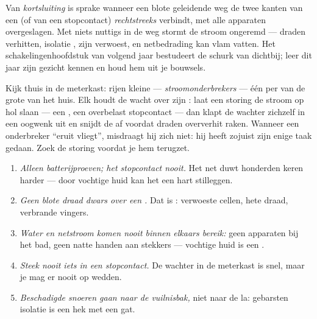\begin{definition}[Kortsluiting]\label{def:g6:circuits-and-safety:short}
Van \emph{kortsluiting} is sprake wanneer een
blote geleidende weg de twee kanten van een  (of van een
stopcontact) \emph{rechtstreeks} verbindt, met alle apparaten
overgeslagen. Met niets nuttigs in de weg stormt de stroom
ongeremd --- draden verhitten, isolatie ,  zijn
verwoest, en netbedrading kan vlam vatten. Het schakelingenhoofdstuk
van volgend jaar bestudeert de schurk van dichtbij; leer dit jaar zijn
gezicht kennen en houd hem uit je bouwsels.
\end{definition}

\begin{remark}\label{rem:g6:circuits-and-safety:guards}
Kijk thuis in de meterkast: rijen kleine  ---
\emph{stroomonderbrekers} --- één per  van de grote
 van het huis. Elk houdt de wacht over zijn
: laat een storing de stroom op hol slaan --- een
, een overbelast stopcontact --- dan klapt de wachter
zichzelf in een oogwenk uit en snijdt de  af voordat draden
oververhit raken. Wanneer een onderbreker ``eruit vliegt'', misdraagt
hij zich niet: hij heeft zojuist zijn enige taak gedaan. Zoek de
storing voordat je hem terugzet.
\end{remark}

\begin{remark}\label{rem:g6:circuits-and-safety:rules}
\begin{enumerate}
  \item \emph{Alleen batterijproeven; het stopcontact nooit.} Het
        net duwt honderden keren harder --- door vochtige huid kan
        het een hart stilleggen.
  \item \emph{Geen blote draad dwars over een .} Dat is
        : verwoeste cellen, hete draad, verbrande
        vingers.
  \item \emph{Water en netstroom komen nooit binnen elkaars bereik:}
        geen apparaten bij het bad, geen natte handen aan stekkers
        --- vochtige huid is een .
  \item \emph{Steek nooit iets in een stopcontact.} De wachter in de
        meterkast is snel, maar je mag er nooit op wedden.
  \item \emph{Beschadigde snoeren gaan naar de vuilnisbak,} niet naar
        de la: gebarsten isolatie is een hek met een gat.
\end{enumerate}
\end{remark}

